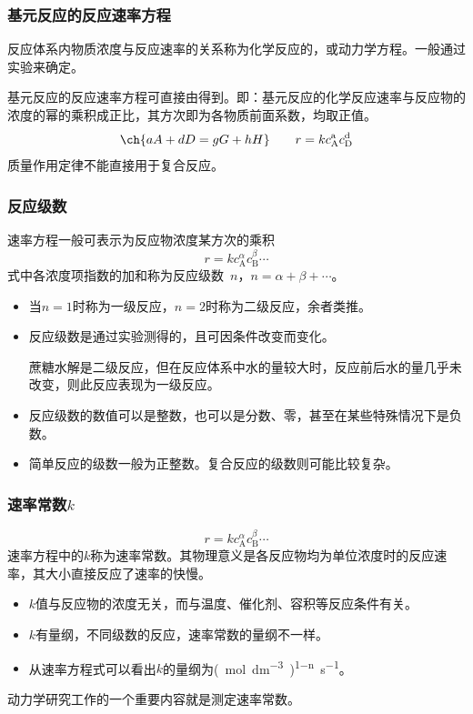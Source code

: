 \documentclass[dvipsnames, svgnames, x11names]{beamer}
\begin{document}
   
    \begin{frame}
        \frametitle{基元反应的反应速率方程}
        反应体系内物质浓度与反应速率的关系称为化学反应的，或动力学方程。一般通过实验来确定。

        基元反应的反应速率方程可直接由得到。即：基元反应的化学反应速率与反应物的浓度的幂的乘积成正比，其方次即为各物质前面系数，均取正值。
        \[
            \ch{aA + dD = gG + hH} \qquad r=kc_\mathrm{A}^\mathrm{a} c_\mathrm{D}^\mathrm{d}
        \]
        质量作用定律不能直接用于复合反应。
    
    \end{frame}
    
    
    \begin{frame}
        \frametitle{反应级数}
    
        速率方程一般可表示为反应物浓度某方次的乘积
        \[
            r=kc_\mathrm{A}^\alpha c_\mathrm{B}^\beta \cdots
        \]
        式中各浓度项指数的加和称为反应级数\ $n$，$n=\alpha+\beta+\cdots$。
        
        \begin{itemize}
            \item 当$n=1$时称为一级反应，$n=2$时称为二级反应，余者类推。
            \item 反应级数是通过实验测得的，且可因条件改变而变化。
            
            蔗糖水解是二级反应，但在反应体系中水的量较大时，反应前后水的量几乎未改变，则此反应表现为一级反应。
            \item 反应级数的数值可以是整数，也可以是分数、零，甚至在某些特殊情况下是负数。
            \item 简单反应的级数一般为正整数。复合反应的级数则可能比较复杂。
        \end{itemize}
        
    \end{frame}

    
    \begin{frame}
        \frametitle{速率常数$k$}
    
        \[
            r=kc_\mathrm{A}^\alpha c_\mathrm{B}^\beta \cdots
        \]
        速率方程中的$k$称为速率常数。其物理意义是各反应物均为单位浓度时的反应速率，其大小直接反应了速率的快慢。
        \begin{itemize}
          \item $k$值与反应物的浓度无关，而与温度、催化剂、容积等反应条件有关。
          \item $k$有量纲，不同级数的反应，速率常数的量纲不一样。
          \item 从速率方程式可以看出$k$的量纲为\si{(mol.dm^{-3})^{1-n}.s^{-1}}。
        \end{itemize}
        
        动力学研究工作的一个重要内容就是测定速率常数。
    
    \end{frame}
\end{document}
